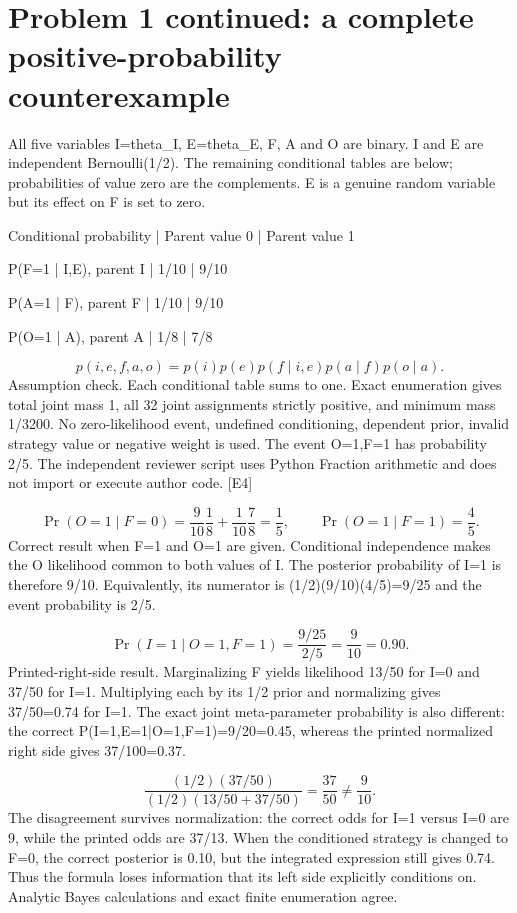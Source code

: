 \documentclass[10pt]{article}
\begin{document}
\section*{Problem 1 continued: a complete positive-probability counterexample}
All five variables I=theta\_I, E=theta\_E, F, A and O are binary. I and E are independent Bernoulli(1/2). The remaining conditional tables are below; probabilities of value zero are the complements. E is a genuine random variable but its effect on F is set to zero.\par
Conditional probability | Parent value 0 | Parent value 1\par
P(F=1 | I,E), parent I | 1/10 | 9/10\par
P(A=1 | F), parent F | 1/10 | 9/10\par
P(O=1 | A), parent A | 1/8 | 7/8\par
\[p(i,e,f,a,o)=p(i)p(e)p(f\mid i,e)p(a\mid f)p(o\mid a).\] Assumption check. Each conditional table sums to one. Exact enumeration gives total joint mass 1, all 32 joint assignments strictly positive, and minimum mass 1/3200. No zero-likelihood event, undefined conditioning, dependent prior, invalid strategy value or negative weight is used. The event O=1,F=1 has probability 2/5. The independent reviewer script uses Python Fraction arithmetic and does not import or execute author code. [E4]\par
\[\Pr(O=1\mid F=0)=\frac9{10}\frac18+\frac1{10}\frac78=\frac15,\qquad \Pr(O=1\mid F=1)=\frac45.\] Correct result when F=1 and O=1 are given. Conditional independence makes the O likelihood common to both values of I. The posterior probability of I=1 is therefore 9/10. Equivalently, its numerator is (1/2)(9/10)(4/5)=9/25 and the event probability is 2/5.\par
\[\Pr(I=1\mid O=1,F=1)=\frac{9/25}{2/5}=\frac9{10}=0.90.\] Printed-right-side result. Marginalizing F yields likelihood 13/50 for I=0 and 37/50 for I=1. Multiplying each by its 1/2 prior and normalizing gives 37/50=0.74 for I=1. The exact joint meta-parameter probability is also different: the correct P(I=1,E=1|O=1,F=1)=9/20=0.45, whereas the printed normalized right side gives 37/100=0.37.\par
\[\frac{(1/2)(37/50)}{(1/2)(13/50+37/50)}=\frac{37}{50}\ne\frac9{10}.\] The disagreement survives normalization: the correct odds for I=1 versus I=0 are 9, while the printed odds are 37/13. When the conditioned strategy is changed to F=0, the correct posterior is 0.10, but the integrated expression still gives 0.74. Thus the formula loses information that its left side explicitly conditions on. Analytic Bayes calculations and exact finite enumeration agree.\par
\end{document}
